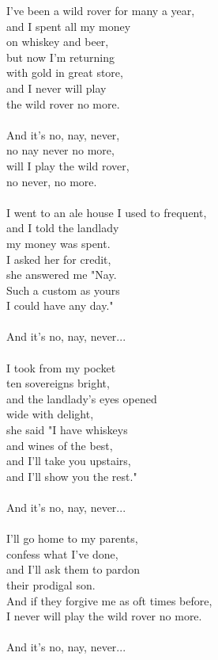 
I've been a wild rover for many a year, \\ and I spent all my money \\ on whiskey and beer, \\ but now I'm returning \\ with gold in great store, \\ and I never will play \\ the wild rover no more. \\ \hspace{10mm} \\ And it's no, nay, never, \\ no nay never no more, \\ will I play the wild rover, \\ no never, no more. \\ \hspace{10mm} \\ I went to an ale house I used to frequent, \\ and I told the landlady \\ my money was spent. \\ I asked her for credit, \\ she answered me "Nay. \\ Such a custom as yours \\ I could have any day." \\ \hspace{10mm} \\ And it's no, nay, never... \\ \hspace{10mm} \\ I took from my pocket \\ ten sovereigns bright, \\ and the landlady's eyes opened \\ wide with delight, \\ she said "I have whiskeys \\ and wines of the best, \\ and I'll take you upstairs, \\ and I'll show you the rest." \\ \hspace{10mm} \\ And it's no, nay, never... \\ \hspace{10mm} \\ I'll go home to my parents, \\ confess what I've done, \\ and I'll ask them to pardon \\ their prodigal son. \\ And if they forgive me as oft times before, \\ I never will play the wild rover no more. \\ \hspace{10mm} \\ And it's no, nay, never...